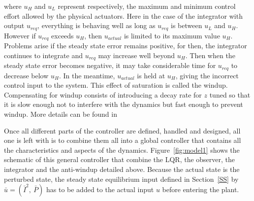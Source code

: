 \documentclass{iopart}
\begin{document}
where $u_H$ and $u_L$ represent respectively, the maximum and minimum control effort allowed by the physical actuators.
Here in the case of the integrator with output $u_{req}$, everything is behaving well as long as $u_{req}$ is between $u_L$ and $u_H$. However if $u_{req}$ exceeds $u_H$, then $u_{actual}$ is limited to its maximum value $u_H$. Problems arise if the steady state error remains positive, for then, the integrator continues to integrate and $u_{req}$ may increase well beyond $u_H$. Then when the steady state error becomes negative, it may take considerable time for $u_{req}$ to decrease below $u_H$. In the meantime, $u_{actual}$ is held at $u_H$, giving the incorrect control input to the system.
This effect of saturation is called the windup.  
Compensating for windup consists of introducing a decay rate for $z$ tuned so that it is slow enough not to interfere with the dynamics but fast enough to prevent windup. More details can be found in \cite{AandM, Lewis}

Once all different parts of the controller are defined, handled and designed, all one is left with is to combine them all into a global controller that contains all the characteristics and aspects of the dynamics.
Figure~\ref{fig:model1} shows the schematic of this general controller that combine the LQR, the observer, the integrator and the anti-windup detailed above. Because the actual state is the perturbed state, the steady state equilibrium input defined in Section~\ref{SS} by $\bar{u} = \left( \bar{I}^{2}, \   \bar{P} \right)$ has to be added to the actual input $u$ before entering the plant.
\end{document}
